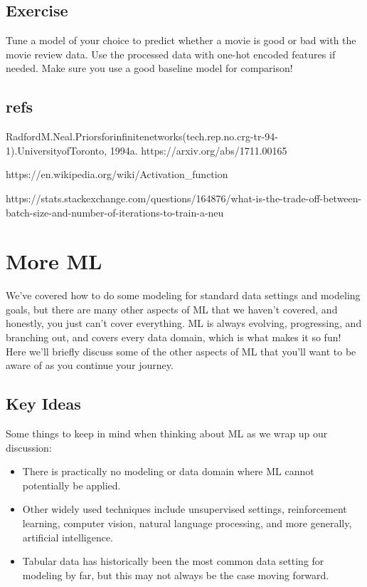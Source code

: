 \documentclass[
  letterpaper,
]{krantz}
\providecommand{\tightlist}{%
  \setlength{\itemsep}{0pt}\setlength{\parskip}{0pt}}\usepackage{longtable,booktabs,array}
\begin{document}
\section{Exercise}\label{exercise}

Tune a model of your choice to predict whether a movie is good or bad
with the movie review data. Use the processed data with one-hot encoded
features if needed. Make sure you use a good baseline model for
comparison!

\section{refs}\label{refs-2}

RadfordM.Neal.Priorsforinfinitenetworks(tech.rep.no.crg-tr-94-1).UniversityofToronto,
1994a. https://arxiv.org/abs/1711.00165

https://en.wikipedia.org/wiki/Activation\_function

https://stats.stackexchange.com/questions/164876/what-is-the-trade-off-between-batch-size-and-number-of-iterations-to-train-a-neu

\chapter{More ML}\label{more-ml}

We've covered how to do some modeling for standard data settings and
modeling goals, but there are many other aspects of ML that we haven't
covered, and honestly, you just can't cover everything. ML is always
evolving, progressing, and branching out, and covers every data domain,
which is what makes it so fun! Here we'll briefly discuss some of the
other aspects of ML that you'll want to be aware of as you continue your
journey.

\section{Key Ideas}\label{key-ideas-5}

Some things to keep in mind when thinking about ML as we wrap up our
discussion:

\begin{itemize}
\tightlist
\item
  There is practically no modeling or data domain where ML cannot
  potentially be applied.
\item
  Other widely used techniques include unsupervised settings,
  reinforcement learning, computer vision, natural language processing,
  and more generally, artificial intelligence.
\item
  Tabular data has historically been the most common data setting for
  modeling by far, but this may not always be the case moving forward.
\end{itemize}
\end{document}
